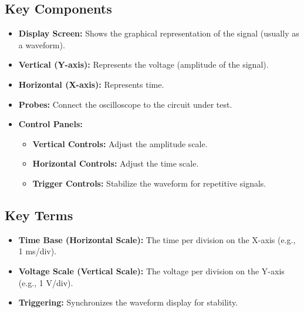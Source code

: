 \documentclass[12pt]{article}
\begin{document}
\subsection{ Key Components}
\begin{itemize}
    \item \textbf{Display Screen:} Shows the graphical representation of the signal (usually as a waveform).
    \item \textbf{Vertical (Y-axis):} Represents the voltage (amplitude of the signal).
    \item \textbf{Horizontal (X-axis):} Represents time.
    \item \textbf{Probes:} Connect the oscilloscope to the circuit under test.
    \item \textbf{Control Panels:}
    \begin{itemize}
        \item \textbf{Vertical Controls:} Adjust the amplitude scale.
        \item \textbf{Horizontal Controls:} Adjust the time scale.
        \item \textbf{Trigger Controls:} Stabilize the waveform for repetitive signals.
    \end{itemize}
\end{itemize}
\subsection{Key Terms}
\begin{itemize}
    \item \textbf{Time Base (Horizontal Scale):} The time per division on the X-axis (e.g., 1 ms/div).
    \item \textbf{Voltage Scale (Vertical Scale):} The voltage per division on the Y-axis (e.g., 1 V/div).
    \item \textbf{Triggering:} Synchronizes the waveform display for stability.
\end{itemize}
\end{document}
